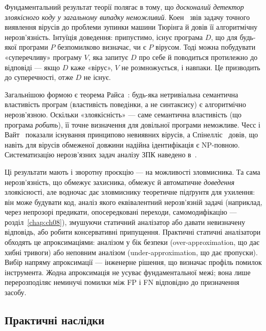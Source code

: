 Фундаментальний результат теорії полягає в тому, що \emph{досконалий детектор злоякісного коду у загальному випадку неможливий}. Коен~\cite{ch01:cohen} звів задачу точного виявлення вірусів до проблеми зупинки машини Тюрінга й довів її алгоритмічну нерозв'язність. Інтуїція доведення: припустимо, існує програма $D$, що для будь-якої програми $P$ безпомилково визначає, чи є $P$ вірусом. Тоді можна побудувати «суперечливу» програму $V$, яка запитує $D$ про себе й поводиться протилежно до відповіді --- якщо $D$ каже «вірус», $V$ не розмножується, і навпаки. Це призводить до суперечності, отже $D$ не існує.

Загальнішою формою є теорема Райса~\cite{ch03:rice}: будь-яка нетривіальна семантична властивість програм (властивість поведінки, а не синтаксису) є алгоритмічно нерозв'язною. Оскільки «злоякісність» --- саме семантична властивість (що програма \emph{робить}), її точне визначення для довільної програми неможливе. Чесс і Вайт~\cite{ch03:chess} показали існування принципово невиявних вірусів, а Спінелліс~\cite{ch03:spinellis} довів, що навіть для вірусів обмеженої довжини надійна ідентифікація є NP-повною. Систематизацію нерозв'язних задач аналізу ЗПК наведено в~\cite{ch03:selcuk}.

Ці результати мають і зворотну проєкцію --- на можливості зловмисника. Та сама нерозв'язність, що обмежує захисника, обмежує й автоматичне \emph{доведення} злоякісності, але водночас дає зловмиснику теоретичне підґрунтя для ухилення: він може будувати код, аналіз якого еквівалентний нерозв'язній задачі (наприклад, через непрозорі предикати, опосередковані переходи, самомодифікацію --- розділ~\ref{chap:ch08}), змушуючи статичний аналізатор або давати невизначену відповідь, або робити консервативні припущення. Практичні статичні аналізатори обходять це апроксимаціями: аналізом у бік безпеки (over-approximation, що дає хибні тривоги) або неповним аналізом (under-approximation, що дає пропуски). Вибір напряму апроксимації --- інженерне рішення, що визначає профіль помилок інструмента. Жодна апроксимація не усуває фундаментальної межі; вона лише перерозподіляє неминучі помилки між FP і FN відповідно до призначення засобу.

\subsection{Практичні наслідки}

